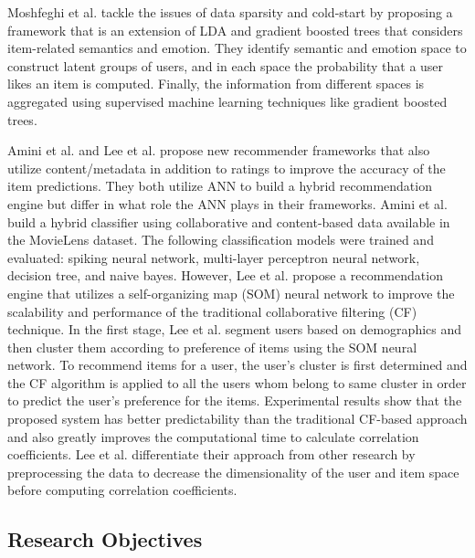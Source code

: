 \documentclass[12pt]{article}
\begin{document}
Moshfeghi et al. \cite{moshfeghi} tackle the issues of data sparsity and cold-start by proposing a framework that is an extension of LDA and gradient boosted trees that considers item-related semantics and emotion. They identify semantic and emotion space to construct latent groups of users, and in each space the probability that a user likes an item is computed. Finally, the information from different spaces is aggregated using supervised machine learning techniques like gradient boosted trees. 

Amini et al. \cite{amini} and Lee et al. \cite{lee} propose new recommender frameworks that also utilize content/metadata in addition to ratings to improve the accuracy of the item predictions. They both utilize ANN to build a hybrid recommendation engine but differ in what role the ANN plays in their frameworks. Amini et al. \cite{amini} build a hybrid classifier using collaborative and content-based data available in the MovieLens dataset. The following classification models were trained and evaluated: spiking neural network, multi-layer perceptron neural network, decision tree, and naive bayes. However, Lee et al. \cite{lee} propose a recommendation engine that utilizes a self-organizing map (SOM) neural network to improve the scalability and performance of the traditional collaborative filtering (CF) technique. In the first stage, Lee et al. \cite{lee} segment users based on demographics and then cluster them according to preference of items using the SOM neural network. To recommend items for a user, the user's cluster is first determined and the CF algorithm is applied to all the users whom belong to same cluster in order to predict the user's preference for the items. Experimental results show that the proposed system has better predictability than the traditional CF-based approach and also greatly improves the computational time to calculate correlation coefficients. Lee et al. \cite{lee} differentiate their approach from other research by preprocessing the data to decrease the dimensionality of the user and item space before computing correlation coefficients. 

\subsection{Research Objectives}
\end{document}
